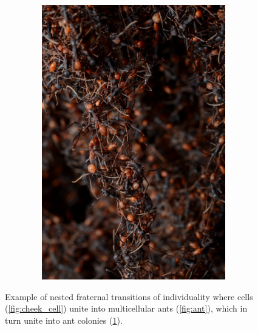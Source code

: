 \begin{figure}
\begin{subfigure}[b]{\textwidth}
\begin{columns}
\begin{column}{0.75\textwidth}
  \end{column}
  \begin{column}{0.05\textwidth}
    \cite{quinzani_2008}
  \end{column}
  \end{columns}
 \end{subfigure}\\
 \begin{subfigure}[b]{\textwidth}
  \begin{columns}
  \begin{column}{0.10\textwidth}
   \caption{}%
   \label{fig:ant_bridge}
  \end{column}
  \begin{column}{0.75\textwidth}
    \includegraphics[angle=270,width=\textwidth]{img/ant_bridge}
  \end{column}
  \begin{column}{0.05\textwidth}
    \cite{gallice_2011}
  \end{column}
  \end{columns}
 \end{subfigure}
 \caption{
 Example of nested fraternal transitions of individuality where cells (\ref{fig:cheek_cell}) unite into multicellular ants (\ref{fig:ant}), which in turn unite into ant colonies (\ref{fig:ant_bridge}).
 }
 \label{fig:fraternal}
\end{figure}
